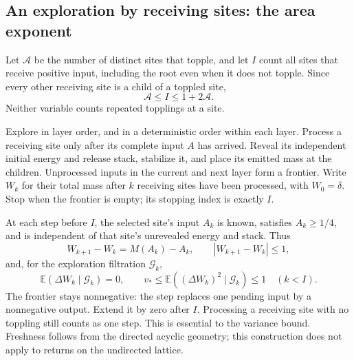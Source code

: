 \documentclass[11pt]{article}
\numberwithin{equation}{section}
\theoremstyle{definition}
\newcommand{\E}{\mathbb E}
\begin{document}
\subsection{An exploration by receiving sites: the area exponent}\label{sec:area}
Let $\mathcal A$ be the number of distinct sites that topple, and let $I$ count all sites that receive positive input, including the root even when it does not topple. Since every other receiving site is a child of a toppled site,
\begin{equation}\label{eq:area-comparison}
 \mathcal A\le I\le1+2\mathcal A.
\end{equation}
Neither variable counts repeated topplings at a site.

Explore in layer order, and in a deterministic order within each layer. Process a receiving site only after its complete input $A$ has arrived. Reveal its independent initial energy and release stack, stabilize it, and place its emitted mass at the children. Unprocessed inputs in the current and next layer form a frontier. Write $W_k$ for their total mass after $k$ receiving sites have been processed, with $W_0=\delta$. Stop when the frontier is empty; its stopping index is exactly $I$.

At each step before $I$, the selected site's input $A_k$ is known, satisfies $A_k\ge1/4$, and is independent of that site's unrevealed energy and stack. Thus
\begin{equation}\label{eq:frontier-martingale}
 W_{k+1}-W_k=M(A_k)-A_k,\qquad
 |W_{k+1}-W_k|\le1,
\end{equation}
and, for the exploration filtration $\mathcal G_k$,
\begin{equation}\label{eq:frontier-variance}
 \E(\Delta W_k\mid\mathcal G_k)=0,\qquad
 v_*\le\E((\Delta W_k)^2\mid\mathcal G_k)\le1
 \quad(k<I).
\end{equation}
The frontier stays nonnegative: the step replaces one pending input by a nonnegative output. Extend it by zero after $I$. Processing a receiving site with no toppling still counts as one step. This is essential to the variance bound. Freshness follows from the directed acyclic geometry; this construction does not apply to returns on the undirected lattice.
\end{document}

